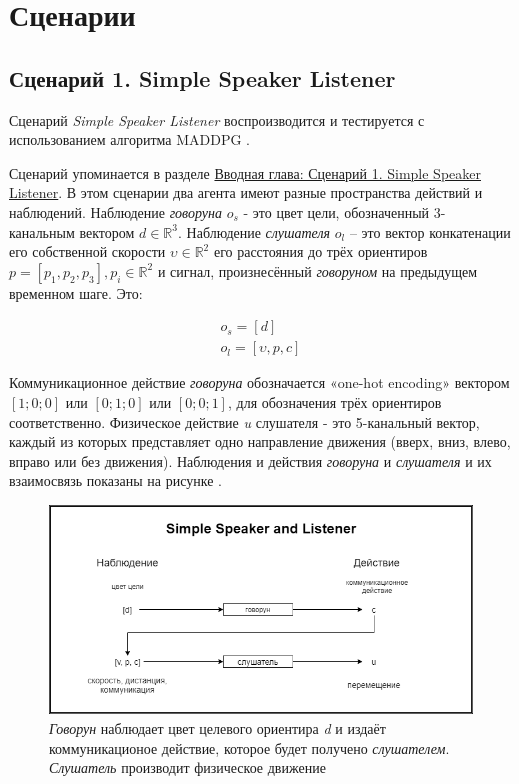 \section{Сценарии}

\subsection{Сценарий 1. Simple Speaker Listener}  \label{exp-ssl}

Сценарий \textit{Simple Speaker Listener} воспроизводится и тестируется с использованием алгоритма MADDPG \cite{lowe2017multiagent}.

Сценарий упоминается в разделе \hyperref[intro:ssl]{Вводная глава: Сценарий 1. Simple Speaker Listener}. В этом сценарии два агента имеют разные пространства действий и наблюдений. Наблюдение \textit{говоруна} $o_s$ - это цвет цели, обозначенный 3- канальным вектором $d \in \mathbb{R}^3$. Наблюдение \textit{слушателя} $o_l$ – это вектор конкатенации его собственной скорости $\upsilon \in \mathbb{R}^2$ его расстояния до трёх ориентиров $p = [p_1, p_2, p_3], p_i \in \mathbb{R}^2$ и сигнал, произнесённый \textit{говоруном} на предыдущем временном шаге. Это:

\begin{equation}
    \begin{multlined}
        o_s = [d] \\
        o_l = [\upsilon, p, c]
    \end{multlined}
\end{equation}

Коммуникационное действие \textit{говоруна} обозначается «one-hot encoding» вектором $[1; 0; 0]$ или $[0; 1; 0]$ или $[0; 0; 1]$, для обозначения трёх ориентиров соответственно.
Физическое действие \textit{u} слушателя - это 5-канальный вектор, каждый из которых представляет одно направление движения (вверх, вниз, влево, вправо или без движения). Наблюдения и действия \textit{говоруна} и \textit{слушателя} и их взаимосвязь показаны на рисунке .

\begin{figure}[ht!]
    \center
    \includegraphics [scale=0.60] {my_folder/images/ch4/simple_speaker_listener.png}
    \caption{\textit{Говорун} наблюдает цвет целевого ориентира \textit{d} и издаёт коммуникационое действие, которое будет получено \textit{слушателем}. \textit{Слушатель} производит физическое движение}
    \label{fig:ch4-ssl}
\end{figure}

